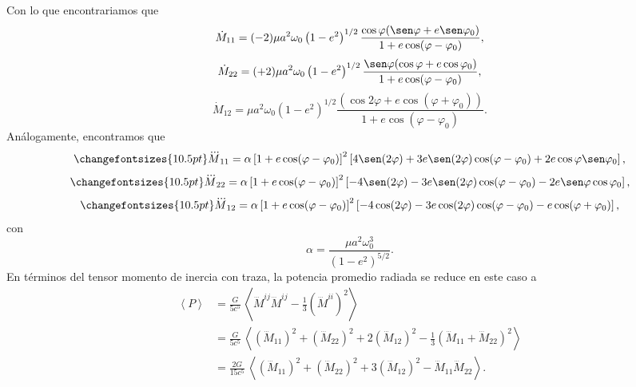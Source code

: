 Con lo que encontrariamos que 
\begin{equation*}
\dot{M}_{11}=(-2)\mu a^2\omega_0\left(1-e^2\right)^{1/2}\frac{\cos\varphi(\sen\varphi+e\sen\varphi_0)}{1+e\cos(\varphi-\varphi_0)},
\end{equation*}
\begin{equation*}
\dot{M}_{22}=(+2)\mu a^2\omega_0\left(1-e^2\right)^{1/2}\frac{\sen\varphi(\cos\varphi+e\cos\varphi_0)}{1+e\cos(\varphi-\varphi_0)},
\end{equation*}
\begin{equation*}
    \dot{M}_{12}=\mu a^2\omega_0\left(1-e^2\right)^{1/2}\frac{(\cos2\varphi+e\cos(\varphi+\varphi_0))}{1+e\cos(\varphi-\varphi_0)}.
\end{equation*}
Análogamente, encontramos que
\begin{equation}\label{eq:I11}
    \changefontsizes{10.5pt}
\dddot{M}_{11}=\alpha\left[1+e\cos(\varphi-\varphi_0)\right]^2 \left[4\sen(2\varphi)+3e\sen(2\varphi)\cos(\varphi-\varphi_0)
+2e\cos\varphi\sen\varphi_0\right],
\end{equation}
\begin{equation}\label{eq:I22}
    \changefontsizes{10.5pt}
\dddot{M}_{22}=\alpha\left[1+e\cos(\varphi-\varphi_0)\right]^2 \left[-4\sen(2\varphi)-3e\sen(2\varphi)\cos(\varphi-\varphi_0)
-2e\sen\varphi\cos\varphi_0\right],
\end{equation}
\begin{equation}\label{eq:I12}
    \changefontsizes{10.5pt}
\dddot{M}_{12}=\alpha\left[1+e\cos(\varphi-\varphi_0)\right]^2 \left[-4\cos(2\varphi)-3e\cos(2\varphi)\cos(\varphi-\varphi_0)
-e\cos(\varphi+\varphi_0)\right],
\end{equation}
con
\begin{equation*}
\alpha=\frac{\mu a^2\omega_0^3}{\left(1-e^2\right)^{5/2}}.
\end{equation*}
En términos del tensor momento de inercia con traza, la potencia promedio radiada se reduce en este caso a
\begin{align*}
\left\langle P\right\rangle &=\frac{G}{5c^5}\, \left\langle \dddot{M}^{ij}\dddot{M}^{ij}-\frac{1}{3}\left(\dddot{M}^{ii}\right)^2\right\rangle \\
&=\frac{G}{5c^5}\, \left\langle \left(\dddot{M}_{11}\right)^2+ \left(\dddot{M}_{22}\right)^2+2 \left(\dddot{M}_{12}\right)^2-\frac{1}{3}\left(\dddot{M}_{11}+\dddot{M}_{22}\right)^2\right\rangle \\
&=\frac{2G}{15c^5}\, \left\langle \left(\dddot{M}_{11}\right)^2+ \left(\dddot{M}_{22}\right)^2+3\left(\dddot{M}_{12}\right)^2 -\dddot{M}_{11}\dddot{M}_{22}\right\rangle .
\end{align*}
